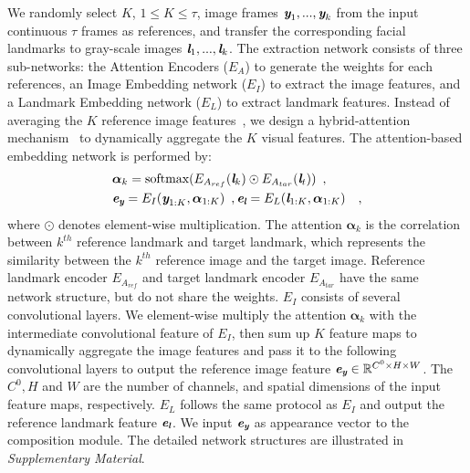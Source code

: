 \documentclass[runningheads]{llncs}
\def\mathbi#1{\textbf{\em #1}}
\begin{document}
\indent We randomly select $K$, $1 \leq K \leq \tau$, image frames $\mathbi{y}_1, ..., \mathbi{y}_k$ from the input continuous $\tau$ frames as references, and transfer the corresponding facial landmarks to gray-scale images  $\mathbi{l}_1,..., \mathbi{l}_k$. The extraction network consists of three sub-networks: the Attention Encoders ($E_{A}$) to generate the weights for each references, an Image Embedding network ($E_{I}$) to extract the image features, and a Landmark Embedding network ($E_{L}$) to extract landmark features. Instead of averaging the $K$ reference image features~\cite{zakharov2019few,chung2017you,wiles2018x2face}, we design a hybrid-attention mechanism~\cite{wang2019few,pumarola2019ganimation} to dynamically aggregate the $K$ visual features. The attention-based embedding network is performed by:
\begin{align}
\label{eq:attention}
&\boldsymbol{\alpha}_{k} = \text{softmax}( E_{A_{ref}}(\mathbi{l}_k) \odot E_{A_{tar}}(\mathbi{l}_t))
\enspace, \\
\label{eq:img_embed}
&\mathbi{e}_{\mathbi{y}} =  E_{I}(\mathbi{y}_{1:K}, \boldsymbol{\alpha}_{1:K})
\enspace,  \mathbi{e}_{\mathbi{l}} =  E_{L}(\mathbi{l}_{1:K}, \boldsymbol{\alpha}_{1:K}) \enspace  \enspace,
\end{align}
where $\odot$ denotes element-wise multiplication. The attention $\boldsymbol{\alpha}_{k}$ is the correlation between ${k^{th}}$ reference landmark and target landmark, which represents the similarity between the ${k^{th}}$ reference image and the target image. Reference landmark encoder $E_{A_{ref}}$ and target landmark encoder $E_{A_{tar}}$ have the same network structure, but do not share the weights. $E_{I}$ consists of several convolutional layers. We element-wise multiply the attention $\boldsymbol{\alpha}_{k}$ with the intermediate convolutional feature of $E_{I}$, then sum up $K$ feature maps to dynamically aggregate the image features and pass it to the following convolutional layers to output the reference image feature $\mathbi{e}_{\mathbi{y}}  \in \mathbb{R}^{ C^0 \times  H \times W}$. The $C^0, H$ and $W$ are the number of channels, and spatial dimensions of the input feature maps, respectively. $E_{L}$ follows the same protocol as $E_{I}$ and output the reference landmark feature $\mathbi{e}_{\mathbi{l}}$. We input $\mathbi{e}_{\mathbi{y}}$ as appearance vector to the composition module. The detailed network structures are illustrated in \textit{Supplementary Material}. 
\end{document}
